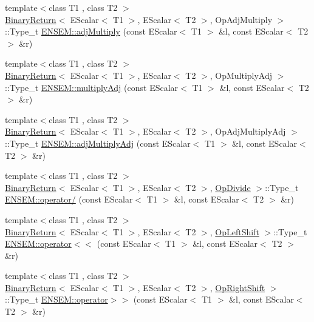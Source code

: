 \begin{DoxyCompactItemize}
\item 
{\footnotesize template$<$class T1 , class T2 $>$ }\\\mbox{\hyperlink{structBinaryReturn}{Binary\+Return}}$<$ E\+Scalar$<$ T1 $>$, E\+Scalar$<$ T2 $>$, Op\+Adj\+Multiply $>$\+::Type\+\_\+t \mbox{\hyperlink{group__escalar_ga8cef36c4e2779c7d7dbf64b9500b053c}{E\+N\+S\+E\+M\+::adj\+Multiply}} (const E\+Scalar$<$ T1 $>$ \&l, const E\+Scalar$<$ T2 $>$ \&r)
\item 
{\footnotesize template$<$class T1 , class T2 $>$ }\\\mbox{\hyperlink{structBinaryReturn}{Binary\+Return}}$<$ E\+Scalar$<$ T1 $>$, E\+Scalar$<$ T2 $>$, Op\+Multiply\+Adj $>$\+::Type\+\_\+t \mbox{\hyperlink{group__escalar_ga90260817012914a08b2475f4cc5c94a7}{E\+N\+S\+E\+M\+::multiply\+Adj}} (const E\+Scalar$<$ T1 $>$ \&l, const E\+Scalar$<$ T2 $>$ \&r)
\item 
{\footnotesize template$<$class T1 , class T2 $>$ }\\\mbox{\hyperlink{structBinaryReturn}{Binary\+Return}}$<$ E\+Scalar$<$ T1 $>$, E\+Scalar$<$ T2 $>$, Op\+Adj\+Multiply\+Adj $>$\+::Type\+\_\+t \mbox{\hyperlink{group__escalar_gab3c0c146aa415c32cb9ce5a6ad426d10}{E\+N\+S\+E\+M\+::adj\+Multiply\+Adj}} (const E\+Scalar$<$ T1 $>$ \&l, const E\+Scalar$<$ T2 $>$ \&r)
\item 
{\footnotesize template$<$class T1 , class T2 $>$ }\\\mbox{\hyperlink{structBinaryReturn}{Binary\+Return}}$<$ E\+Scalar$<$ T1 $>$, E\+Scalar$<$ T2 $>$, \mbox{\hyperlink{structOpDivide}{Op\+Divide}} $>$\+::Type\+\_\+t \mbox{\hyperlink{group__escalar_ga6afeb39f3b92a8cfc99b5dc1689d0488}{E\+N\+S\+E\+M\+::operator/}} (const E\+Scalar$<$ T1 $>$ \&l, const E\+Scalar$<$ T2 $>$ \&r)
\item 
{\footnotesize template$<$class T1 , class T2 $>$ }\\\mbox{\hyperlink{structBinaryReturn}{Binary\+Return}}$<$ E\+Scalar$<$ T1 $>$, E\+Scalar$<$ T2 $>$, \mbox{\hyperlink{structOpLeftShift}{Op\+Left\+Shift}} $>$\+::Type\+\_\+t \mbox{\hyperlink{group__escalar_ga70b4aa1415cb636de9b4b0d56d26486b}{E\+N\+S\+E\+M\+::operator$<$$<$}} (const E\+Scalar$<$ T1 $>$ \&l, const E\+Scalar$<$ T2 $>$ \&r)
\item 
{\footnotesize template$<$class T1 , class T2 $>$ }\\\mbox{\hyperlink{structBinaryReturn}{Binary\+Return}}$<$ E\+Scalar$<$ T1 $>$, E\+Scalar$<$ T2 $>$, \mbox{\hyperlink{structOpRightShift}{Op\+Right\+Shift}} $>$\+::Type\+\_\+t \mbox{\hyperlink{group__escalar_gacaa61f35659a0336281352bbdbef1112}{E\+N\+S\+E\+M\+::operator$>$$>$}} (const E\+Scalar$<$ T1 $>$ \&l, const E\+Scalar$<$ T2 $>$ \&r)

\end{DoxyCompactItemize}
